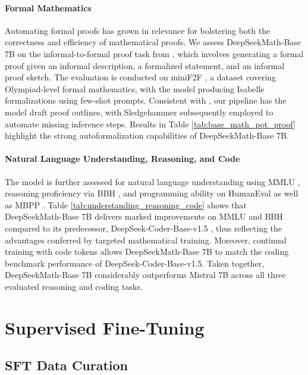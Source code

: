 \paragraph{Formal Mathematics}

Automating formal proofs has grown in relevance for bolstering both the correctness and efficiency of mathematical proofs. We assess DeepSeekMath-Base 7B on the informal-to-formal proof task from \citep{dsp_proof}, which involves generating a formal proof given an informal description, a formalized statement, and an informal proof sketch. The evaluation is conducted on miniF2F \citep{minif2f}, a dataset covering Olympiad-level formal mathematics, with the model producing Isabelle formalizations using few-shot prompts. Consistent with \cite{dsp_proof}, our pipeline has the model draft proof outlines, with Sledgehammer \citep{sledgehammer} subsequently employed to automate missing inference steps. Results in Table \ref{tab:base_math_pot_proof} highlight the strong autoformalization capabilities of DeepSeekMath-Base 7B.

\paragraph{Natural Language Understanding, Reasoning, and Code}

The model is further assessed for natural language understanding using MMLU \citep{mmlu}, reasoning proficiency via BBH \citep{bbh}, and programming ability on HumanEval \citep{codex} as well as MBPP \citep{mbpp}. Table \ref{tab:understanding_reasoning_code} shows that DeepSeekMath-Base 7B delivers marked improvements on MMLU and BBH compared to its predecessor, DeepSeek-Coder-Base-v1.5 \citep{deepseek-coder}, thus reflecting the advantages conferred by targeted mathematical training. Moreover, continual training with code tokens allows DeepSeekMath-Base 7B to match the coding benchmark performance of DeepSeek-Coder-Base-v1.5. Taken together, DeepSeekMath-Base 7B considerably outperforms Mistral 7B \citep{mistral} across all three evaluated reasoning and coding tasks.

\section{Supervised Fine-Tuning}

\subsection{SFT Data Curation}

